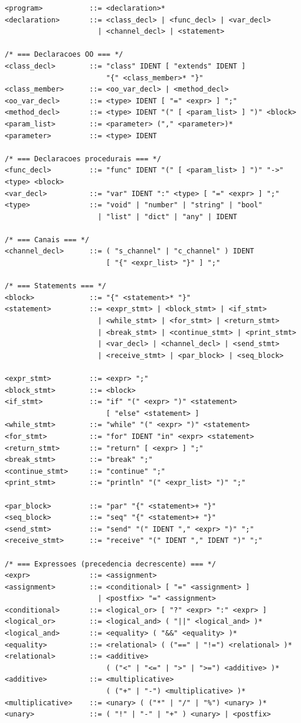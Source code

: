 \documentclass[12pt]{article}
\begin{document}
\begin{lstlisting}[caption={BNF MiniPar 2026.1 OO (gramática formal completa)}]
<program>           ::= <declaration>*
<declaration>       ::= <class_decl> | <func_decl> | <var_decl> 
                      | <channel_decl> | <statement>

/* === Declaracoes OO === */
<class_decl>        ::= "class" IDENT [ "extends" IDENT ] 
                        "{" <class_member>* "}"
<class_member>      ::= <oo_var_decl> | <method_decl>
<oo_var_decl>       ::= <type> IDENT [ "=" <expr> ] ";"
<method_decl>       ::= <type> IDENT "(" [ <param_list> ] ")" <block>
<param_list>        ::= <parameter> ("," <parameter>)*
<parameter>         ::= <type> IDENT

/* === Declaracoes procedurais === */
<func_decl>         ::= "func" IDENT "(" [ <param_list> ] ")" "->" <type> <block>
<var_decl>          ::= "var" IDENT ":" <type> [ "=" <expr> ] ";"
<type>              ::= "void" | "number" | "string" | "bool" 
                      | "list" | "dict" | "any" | IDENT

/* === Canais === */
<channel_decl>      ::= ( "s_channel" | "c_channel" ) IDENT 
                        [ "{" <expr_list> "}" ] ";"

/* === Statements === */
<block>             ::= "{" <statement>* "}"
<statement>         ::= <expr_stmt> | <block_stmt> | <if_stmt> 
                      | <while_stmt> | <for_stmt> | <return_stmt>
                      | <break_stmt> | <continue_stmt> | <print_stmt>
                      | <var_decl> | <channel_decl> | <send_stmt> 
                      | <receive_stmt> | <par_block> | <seq_block>

<expr_stmt>         ::= <expr> ";"
<block_stmt>        ::= <block>
<if_stmt>           ::= "if" "(" <expr> ")" <statement> 
                        [ "else" <statement> ]
<while_stmt>        ::= "while" "(" <expr> ")" <statement>
<for_stmt>          ::= "for" IDENT "in" <expr> <statement>
<return_stmt>       ::= "return" [ <expr> ] ";"
<break_stmt>        ::= "break" ";"
<continue_stmt>     ::= "continue" ";"
<print_stmt>        ::= "println" "(" <expr_list> ")" ";"

<par_block>         ::= "par" "{" <statement>+ "}"
<seq_block>         ::= "seq" "{" <statement>+ "}"
<send_stmt>         ::= "send" "(" IDENT "," <expr> ")" ";"
<receive_stmt>      ::= "receive" "(" IDENT "," IDENT ")" ";"

/* === Expressoes (precedencia decrescente) === */
<expr>              ::= <assignment>
<assignment>        ::= <conditional> [ "=" <assignment> ]
                      | <postfix> "=" <assignment>
<conditional>       ::= <logical_or> [ "?" <expr> ":" <expr> ]
<logical_or>        ::= <logical_and> ( "||" <logical_and> )*
<logical_and>       ::= <equality> ( "&&" <equality> )*
<equality>          ::= <relational> ( ("==" | "!=") <relational> )*
<relational>        ::= <additive> 
                        ( ("<" | "<=" | ">" | ">=") <additive> )*
<additive>          ::= <multiplicative> 
                        ( ("+" | "-") <multiplicative> )*
<multiplicative>    ::= <unary> ( ("*" | "/" | "%") <unary> )*
<unary>             ::= ( "!" | "-" | "+" ) <unary> | <postfix>


\end{lstlisting}
\end{document}
